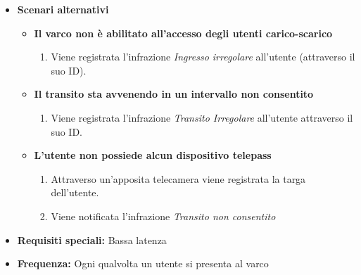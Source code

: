 \documentclass[12pt, letterpaper]{article}
\begin{document}
\begin{itemize}
    \item \textbf{Scenari alternativi}
    \begin{itemize}
        \item \textbf{Il varco non è 
        abilitato all'accesso degli utenti 
        carico-scarico}
        \begin{enumerate}
            \item Viene registrata l'infrazione
            \emph{Ingresso irregolare} all'utente (attraverso
            il suo ID).
        \end{enumerate}
        \item \textbf{Il transito sta avvenendo 
        in un intervallo non consentito}
        \begin{enumerate}
            \item Viene registrata l'infrazione 
            \emph{Transito Irregolare} all'utente 
            attraverso il suo ID.
        \end{enumerate}
        \item \textbf{L'utente non possiede 
        alcun dispositivo telepass}
        \begin{enumerate}
            \item Attraverso un'apposita telecamera 
            viene registrata la targa dell'utente. 
            \item Viene notificata l'infrazione 
            \emph{Transito non consentito} 
        \end{enumerate}
    \end{itemize}
    
    \item \textbf{Requisiti speciali:} Bassa latenza
    \item \textbf{Frequenza:} Ogni qualvolta un utente si 
    presenta al varco
\end{itemize}
\end{document}

